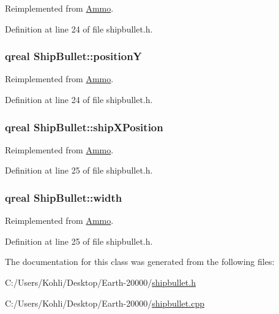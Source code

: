 Reimplemented from \hyperlink{class_ammo_a7df8c23c0a3023e013c25e2b3fff5385}{Ammo}.

Definition at line 24 of file shipbullet.h.\hypertarget{class_ship_bullet_a65c6f482103ca4c3e90648829e8cac5d}{
\subsubsection[{positionY}]{\setlength{\rightskip}{0pt plus 5cm}qreal {\bf ShipBullet::positionY}}}
\label{class_ship_bullet_a65c6f482103ca4c3e90648829e8cac5d}


Reimplemented from \hyperlink{class_ammo_a71fc5db64ac2f32ca10e22f7a7ff0c88}{Ammo}.

Definition at line 24 of file shipbullet.h.\hypertarget{class_ship_bullet_a3af7e87f7c4e261da57f5fe73c41094f}{
\subsubsection[{shipXPosition}]{\setlength{\rightskip}{0pt plus 5cm}qreal {\bf ShipBullet::shipXPosition}}}
\label{class_ship_bullet_a3af7e87f7c4e261da57f5fe73c41094f}


Reimplemented from \hyperlink{class_ammo_a86583f8632ca9604ef0ae839d78fe5ef}{Ammo}.

Definition at line 25 of file shipbullet.h.\hypertarget{class_ship_bullet_a13d7785c8b0cb473a16fa5c9e82f3911}{
\subsubsection[{width}]{\setlength{\rightskip}{0pt plus 5cm}qreal {\bf ShipBullet::width}}}
\label{class_ship_bullet_a13d7785c8b0cb473a16fa5c9e82f3911}


Reimplemented from \hyperlink{class_ammo_aad7996f9abdcb6ade7e67f7c7f5e5ebe}{Ammo}.

Definition at line 25 of file shipbullet.h.

The documentation for this class was generated from the following files:\begin{DoxyCompactItemize}
\item 
C:/Users/Kohli/Desktop/Earth-\/20000/\hyperlink{shipbullet_8h}{shipbullet.h}\item 
C:/Users/Kohli/Desktop/Earth-\/20000/\hyperlink{shipbullet_8cpp}{shipbullet.cpp}\end{DoxyCompactItemize}
